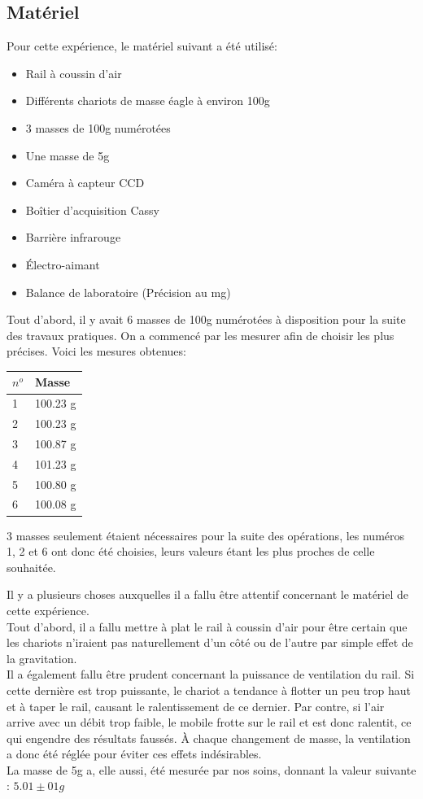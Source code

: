 \subsection{Matériel}
Pour cette expérience, le matériel suivant a été utilisé:
\begin{itemize}
    \item Rail à coussin d'air
    \item Différents chariots de masse éagle à environ 100g
    \item 3 masses de 100g numérotées
    \item Une masse de 5g
    \item Caméra à capteur CCD
    \item Boîtier d'acquisition Cassy
    \item Barrière infrarouge
    \item Électro-aimant
    \item Balance de laboratoire (Précision au mg)
\end{itemize}

Tout d'abord, il y avait 6 masses de 100g numérotées à disposition pour la suite des travaux pratiques. On a commencé par les mesurer afin de choisir les plus précises. Voici les mesures obtenues:
\begin{table}[h]
    \centering
    \begin{tabular}{|l|l|}
	\hline
	$n^o$ & Masse \\
	\hline
	1 & 100.23 g \\
	2 & 100.23 g \\
	3 & 100.87 g \\
	4 & 101.23 g \\
	5 & 100.80 g \\
	6 & 100.08 g \\
	\hline
    \end{tabular}
\end{table}
3 masses seulement étaient nécessaires pour la suite des opérations, les numéros 1, 2 et 6 ont donc été choisies, leurs valeurs étant les plus proches de celle souhaitée.

Il y a plusieurs choses auxquelles il a fallu être attentif concernant le matériel de cette expérience.\\
Tout d'abord, il a fallu mettre à plat le rail à coussin d'air pour être certain que les chariots n'iraient pas naturellement d'un côté ou de l'autre par simple effet de la gravitation.\\
 Il a également fallu être prudent concernant la puissance de ventilation du rail. Si cette dernière est trop puissante, le chariot a tendance à flotter un peu trop haut et à taper le rail, causant le ralentissement de ce dernier. Par contre, si l'air arrive avec un débit trop faible, le mobile frotte sur le rail et est donc ralentit, ce qui engendre des résultats faussés.
À chaque changement de masse, la ventilation a donc été réglée pour éviter ces effets indésirables.\\
La masse de 5g a, elle aussi, été mesurée par nos soins, donnant la valeur suivante : $5.01 \pm 01g$

